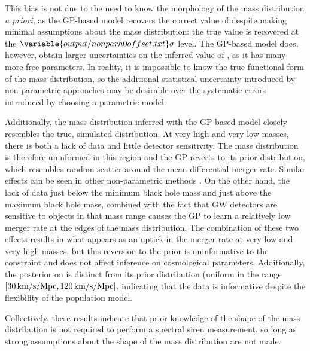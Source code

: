 \documentclass[preprint2,linenumbers]{aastex631}
\begin{document}
This bias is not due to the need to know the morphology of the mass distribution \emph{a priori}, as the \ac{GP}-based model recovers the correct value of \Ho{} despite making minimal assumptions about the mass distribution: the true value is recovered at the $\variable{output/nonparh0offset.txt}\sigma$ level.
The \ac{GP}-based model does, however, obtain larger uncertainties on the inferred value of \Ho, as it has many more free parameters. 
In reality, it is impossible to know the true functional form of the mass distribution, so the additional statistical uncertainty introduced by non-parametric approaches may be desirable over the systematic errors introduced by choosing a parametric model.

Additionally, the mass distribution inferred with the \ac{GP}-based model closely resembles the true, simulated distribution.
At very high and very low masses, there is both a lack of data and little detector sensitivity.
The mass distribution is therefore uninformed in this region and the \ac{GP} reverts to its prior distribution, which resembles random scatter around the mean differential merger rate.
Similar effects can be seen in other non-parametric methods \citep{edelman_cover_2023, callister_parameter-free_2023}.
On the other hand, the lack of data just below the minimum black hole mass and just above the maximum black hole mass, combined with the fact that \ac{GW} detectors are sensitive to objects in that mass range causes the \ac{GP} to learn a relatively low merger rate at the edges of the mass distribution.
The combination of these two effects results in what appears as an uptick in the merger rate at very low and very high masses, but this reversion to the prior is uninformative to the \Ho{} constraint and does not affect inference on cosmological parameters.
Additionally, the posterior on \Ho{} is distinct from its prior distribution (uniform in the range $[30\,\text{km/s/Mpc},120\,\text{km/s/Mpc}]$, indicating that the data is informative despite the flexibility of the population model.

Collectively, these results indicate that prior knowledge of the shape of the mass distribution is not required to perform a spectral siren measurement, so long as strong assumptions about the shape of the mass distribution are not made.
\end{document}
